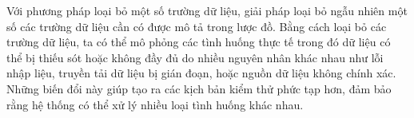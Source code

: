 Với phương pháp loại bỏ một số trường dữ liệu, giải pháp loại bỏ ngẫu nhiên một số các trường dữ liệu cần có được mô tả trong lược đồ. Bằng cách loại bỏ các trường dữ liệu, ta có thể mô phỏng các tình huống thực tế trong đó dữ liệu có thể bị thiếu sót hoặc không đầy đủ do nhiều nguyên nhân khác nhau như lỗi nhập liệu, truyền tải dữ liệu bị gián đoạn, hoặc nguồn dữ liệu không chính xác. Những biến đổi này giúp tạo ra các
kịch bản kiểm thử phức tạp hơn, đảm bảo rằng hệ thống có thể xử lý nhiều loại
tình huống khác nhau.











